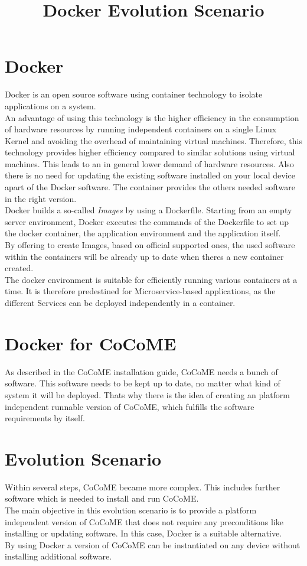\documentclass[runningheads]{llncs}
\begin{document}
\title{Docker Evolution Scenario}
\author{  }
\institute{ }
\maketitle
\section{Docker}\label{docker}
	Docker is an open source software using container technology to isolate applications on a system.\\
	An advantage of using this technology is the higher efficiency in the consumption of hardware resources by running independent containers on a single Linux Kernel and avoiding the overhead of maintaining virtual machines. Therefore, this technology provides higher efficiency compared to similar solutions using virtual machines.
	This leads to an in general lower demand of hardware resources. Also there is no need for updating the existing software installed on your local device apart of the Docker software. The container provides the others needed software in the right version.\\
	Docker builds a so-called \textit{Images} by using a Dockerfile. Starting from an empty server environment, Docker executes the commands of the Dockerfile to set up the docker container, the application environment and the application itself.\\
	By offering to create Images, based on official supported ones, the used software within the containers will be already up to date when theres a new container created.\\
	The docker environment is suitable for efficiently running various containers at a time. It is therefore predestined for Microservice-based applications, as the different Services can be deployed independently in a container. 

\section{Docker for CoCoME}
	As described in the CoCoME installation guide, CoCoME needs a bunch of software. This software needs to be kept up to date, no matter what kind of system it will be deployed. Thats why there is the idea of creating an platform independent runnable version of CoCoME, which fulfills the software requirements by itself.

\section{Evolution Scenario}
	Within several steps, CoCoME became more complex. This includes further software which is needed to install and run CoCoME.\\ 
	The main objective in this evolution scenario is to provide a platform independent version of CoCoME that does not require any preconditions like installing or updating  software. In this case, Docker is a suitable alternative.\\
	By using Docker a version of CoCoME can be instantiated on any device without installing additional software.
	
\end{document}
